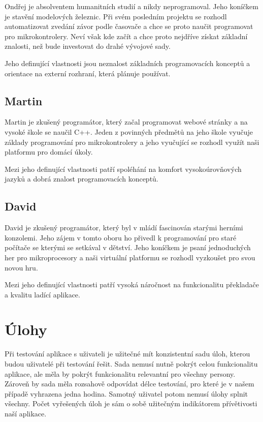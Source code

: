 Ondřej je absolventem humanitních studií a nikdy neprogramoval. Jeho koníčkem je stavění modelových železnic. Při svém posledním projektu se rozhodl automatizovat zvedání závor podle časovače a chce se proto naučit programovat pro mikrokontrolery. Neví však kde začít a chce proto nejdříve získat základní znalosti, než bude investovat do drahé vývojové sady.

Jeho definující vlastnosti jsou neznalost základních programovacích konceptů a orientace na externí rozhraní, která plánuje používat.

\subsection{Martin}
\label{persona:b}

Martin je zkušený programátor, který začal programovat webové stránky a na vysoké škole se naučil C++. Jeden z povinných předmětů na jeho škole vyučuje základy programování pro mikrokontrolery a jeho vyučující se rozhodl využít naši platformu pro domácí úkoly.

Mezi jeho definující vlastnosti patří spoléhání na komfort vysokoúrovňových jazyků a dobrá znalost programovacích konceptů.

\subsection{David}
\label{persona:c}

David je zkušený programátor, který byl v mládí fascinován starými herními konzolemi. Jeho zájem v tomto oboru ho přivedl k programování pro staré počítače se kterými se setkával v dětství. Jeho koníčkem je psaní jednoduchých her pro mikroprocesory a naši virtuální platformu se rozhodl vyzkoušet pro svou novou hru.

Mezi jeho definující vlastnosti patří vysoká náročnost na funkcionalitu překladače a kvalitu ladící aplikace.

\section{Úlohy}

Při testování aplikace s uživateli je užitečné mít konzistentní sadu úloh, kterou budou uživatelé při testování řešit. Sada nemusí nutně pokrýt celou funkcionalitu aplikace, ale měla by pokrýt funkcionalitu relevantní pro všechny persony. Zároveň by sada měla rozsahově odpovídat délce testování, pro které je v našem případě vyhrazena jedna hodina. Samotný uživatel potom nemusí úlohy splnit všechny. Počet vyřešených úloh je sám o sobě užitečným indikátorem přívětivosti naší aplikace.

